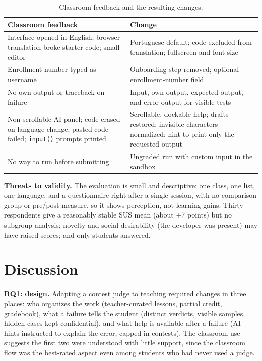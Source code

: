 \documentclass[12pt]{article}
\begin{document}
\begin{table}[ht]
\centering
\scriptsize
\caption{Classroom feedback and the resulting changes.}
\label{tab:feedback-fixes}
\begin{tabular}{>{\raggedright\arraybackslash}p{5.2cm}>{\raggedright\arraybackslash}p{8.8cm}}
\hline
\textbf{Classroom feedback} & \textbf{Change} \\
\hline
Interface opened in English; browser translation broke starter code; small editor & Portuguese default; code excluded from translation; fullscreen and font size \\
Enrollment number typed as username & Onboarding step removed; optional enrollment-number field \\
No own output or traceback on failure & Input, own output, expected output, and error output for visible tests \\
Non-scrollable AI panel; code erased on language change; pasted code failed; \texttt{input()} prompts printed & Scrollable, dockable help; drafts restored; invisible characters normalized; hint to print only the requested output \\
No way to run before submitting & Ungraded run with custom input in the sandbox \\
\hline
\end{tabular}
\end{table}

\textbf{Threats to validity.} The evaluation is small and descriptive: one class, one list, one language, and a questionnaire right after a single session, with no comparison group or pre/post measure, so it shows perception, not learning gains. Thirty respondents give a reasonably stable SUS mean (about $\pm$7 points) but no subgroup analysis; novelty and social desirability (the developer was present) may have raised scores; and only students answered.

\section{Discussion}\label{sec:limitations}\label{sec:future-work}

\textbf{RQ1: design.} Adapting a contest judge to teaching required changes in three places: who organizes the work (teacher-curated lessons, partial credit, gradebook), what a failure tells the student (distinct verdicts, visible samples, hidden cases kept confidential), and what help is available after a failure (AI hints instructed to explain the error, capped in contests). The classroom use suggests the first two were understood with little support, since the classroom flow was the best-rated aspect even among students who had never used a judge.
\end{document}

